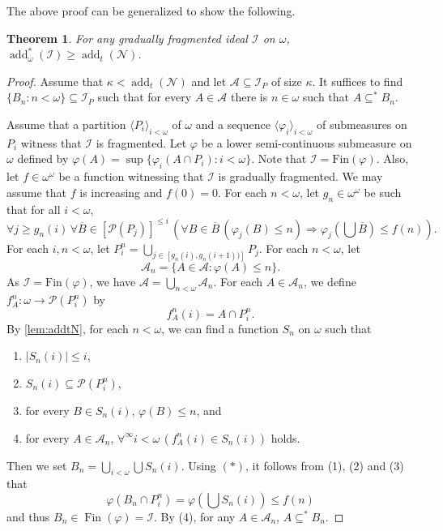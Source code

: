 \documentclass[a4paper,12pt]{amsart}
\newtheorem{thm}{Theorem}
\theoremstyle{definition}
\numberwithin{thm}{section}
\numberwithin{equation}{section}
\DeclareMathOperator{\add}{add}
\newcommand{\I}{\mathscr{I}}
\DeclareMathOperator{\Fin}{Fin}
\renewcommand{\subset}{\subseteq}
\newcommand{\addostar}[1]{\add_\omega^*(#1)}
\newcommand{\Null}{\mathcal{N}}
\begin{document}
    The above proof can be generalized to show the following.

    \begin{thm} \label{thm:addstaromega_grad_frag}
        For any gradually fragmented ideal $\I$ on $\omega$, $\addostar{\I} \geq \add_t{(\Null)}$.
    \end{thm}
    \begin{proof}
        Assume that $\kappa < \add_t(\Null)$ and let $\mathcal{A} \subset \I_P$ of size $\kappa$. It suffices to find $\{B_n:n<\omega\}\subset\I_P$ such that for every $A \in \mathcal{A}$ there is $n\in\omega$ such that $A \subseteq^* B_n$.
        
        Assume that a partition $\langle P_i\rangle_{i<\omega}$ of $\omega$ and a sequence $\langle\varphi_i\rangle_{i<\omega}$ of submeasures on $P_i$ witness that $\I$ is fragmented. Let $\varphi$ be a lower semi-continuous submeasure on $\omega$ defined by $\varphi(A) = \sup\{\varphi_i(A\cap P_i):i<\omega\}$. Note that $\I = \mathrm{Fin}(\varphi)$. Also, let $f\in\omega^\omega$ be a function witnessing that $\I$ is gradually fragmented. We may assume that $f$ is increasing and $f(0)=0$. For each $n<\omega$, let $g_n\in\omega^\omega$ be such that for all $i<\omega$,
        \begin{equation}\label{eqn:grad_frag}
            \forall j\geq g_n(i)\,\forall\overline{B}\in[\mathcal{P}(P_j)]^{\leq i}\,\left(\forall B\in\overline{B}\,(\varphi_j(B)\leq n)\Rightarrow\varphi_j\left(\bigcup\overline{B}\right)\leq f(n)\right).
        \end{equation}
        For each $i, n<\omega$, let $P^n_i = \bigcup_{j\in[g_n(i), g_n(i+1))]}P_j$. For each $n<\omega$, let
        \[
        \mathcal{A}_n = \{ A \in \mathcal{A} : \varphi(A)\leq n \}.
        \]
        As $\I = \mathrm{Fin}(\varphi)$, we have $\mathcal{A} = \bigcup_{n<\omega}\mathcal{A}_n$. For each $A \in \mathcal{A}_n$, we define $f^n_A\colon\omega\to\mathcal{P}(P^n_i)$ by
        \[
        f^n_A (i) = A \cap P^n_i.
        \]
        By \cref{lem:addtN}, for each $n<\omega$, we can find a function $S_n$ on $\omega$ such that
		\begin{enumerate}
			\item $\lvert S_n(i)\rvert \leq i$,
			\item $S_n(i) \subset \mathcal{P}(P^n_i)$,
            \item for every $B\in S_n(i)$, $\varphi(B) \leq n$, and 
			\item for every $A\in\mathcal{A}_n$, $\forall^\infty i<\omega\,(f^n_A(i)\in S_n(i))$ holds.
		\end{enumerate}
        Then we set $B_n = \bigcup_{i<\omega}\bigcup S_n(i)$.
        Using $(*)$, it follows from (1), (2) and (3) that
        \[
        \varphi(B_n\cap P^n_i) = \varphi(\bigcup S_n(i)) \leq f(n)
        \]
        and thus $B_n\in\Fin(\varphi) = \I$. By (4), for any $A\in\mathcal{A}_n$, $A\subset^* B_n$.
   \end{proof}
\end{document}
